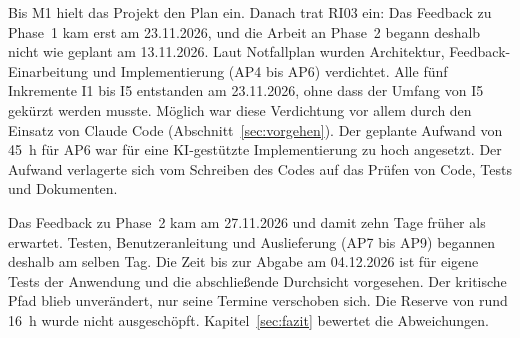 Bis M1 hielt das Projekt den Plan ein. Danach trat RI03 ein: Das Feedback zu Phase~1 kam erst am 23.11.2026, und die Arbeit an Phase~2 begann deshalb nicht wie geplant am 13.11.2026. Laut Notfallplan wurden Architektur, Feedback-Einarbeitung und Implementierung (AP4 bis AP6) verdichtet. Alle fünf Inkremente I1 bis I5 entstanden am 23.11.2026, ohne dass der Umfang von I5 gekürzt werden musste. Möglich war diese Verdichtung vor allem durch den Einsatz von Claude Code (Abschnitt~\ref{sec:vorgehen}). Der geplante Aufwand von 45~h für AP6 war für eine KI-gestützte Implementierung zu hoch angesetzt. Der Aufwand verlagerte sich vom Schreiben des Codes auf das Prüfen von Code, Tests und Dokumenten.

Das Feedback zu Phase~2 kam am 27.11.2026 und damit zehn Tage früher als erwartet. Testen, Benutzeranleitung und Auslieferung (AP7 bis AP9) begannen deshalb am selben Tag. Die Zeit bis zur Abgabe am 04.12.2026 ist für eigene Tests der Anwendung und die abschließende Durchsicht vorgesehen. Der kritische Pfad blieb unverändert, nur seine Termine verschoben sich. Die Reserve von rund 16~h wurde nicht ausgeschöpft. Kapitel~\ref{sec:fazit} bewertet die Abweichungen.
